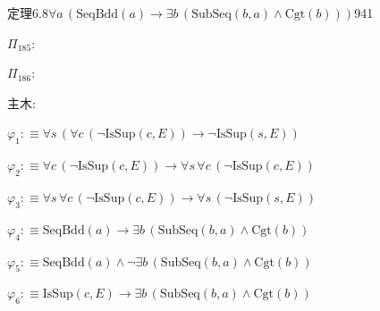 \begin{fullproof}{定理6.8}{$\forall a\,(\mathrm{SeqBdd}(a) \to \exists b\,(\mathrm{SubSeq}(b,a) \land \mathrm{Cgt}(b)))$}{941}
\begin{ptree}
\end{ptree}
\noindent$\Pi_{185}$:
\begin{ptree}
\noLine
{}
\end{ptree}
\noindent$\Pi_{186}$:
\begin{ptree}
\noLine
{}
\noLine
{}
\end{ptree}
\noindent 主木:
\begin{ptree}
\noLine
{}
\end{ptree}
\begin{abbrevlist}
\item $\varphi_{1} :\equiv \forall s\,(\forall c\,(\neg \mathrm{IsSup}(c,E)) \to \neg \mathrm{IsSup}(s,E))$
\item $\varphi_{2} :\equiv \forall c\,(\neg \mathrm{IsSup}(c,E)) \to \forall s\,\forall c\,(\neg \mathrm{IsSup}(c,E))$
\item $\varphi_{3} :\equiv \forall s\,\forall c\,(\neg \mathrm{IsSup}(c,E)) \to \forall s\,(\neg \mathrm{IsSup}(s,E))$
\item $\varphi_{4} :\equiv \mathrm{SeqBdd}(a) \to \exists b\,(\mathrm{SubSeq}(b,a) \land \mathrm{Cgt}(b))$
\item $\varphi_{5} :\equiv \mathrm{SeqBdd}(a) \land \neg \exists b\,(\mathrm{SubSeq}(b,a) \land \mathrm{Cgt}(b))$
\item $\varphi_{6} :\equiv \mathrm{IsSup}(c,E) \to \exists b\,(\mathrm{SubSeq}(b,a) \land \mathrm{Cgt}(b))$

\end{abbrevlist}
\end{fullproof}
